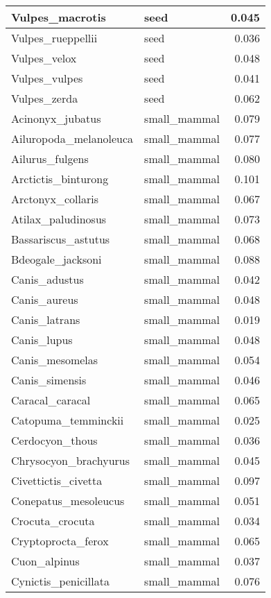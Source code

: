 \begin{table}
\begin{tabular}[t]{l|l|r}
\hline
Vulpes\_macrotis & seed & 0.045\\
\hline
Vulpes\_rueppellii & seed & 0.036\\
\hline
Vulpes\_velox & seed & 0.048\\
\hline
Vulpes\_vulpes & seed & 0.041\\
\hline
Vulpes\_zerda & seed & 0.062\\
\hline
Acinonyx\_jubatus & small\_mammal & 0.079\\
\hline
Ailuropoda\_melanoleuca & small\_mammal & 0.077\\
\hline
Ailurus\_fulgens & small\_mammal & 0.080\\
\hline
Arctictis\_binturong & small\_mammal & 0.101\\
\hline
Arctonyx\_collaris & small\_mammal & 0.067\\
\hline
Atilax\_paludinosus & small\_mammal & 0.073\\
\hline
Bassariscus\_astutus & small\_mammal & 0.068\\
\hline
Bdeogale\_jacksoni & small\_mammal & 0.088\\
\hline
Canis\_adustus & small\_mammal & 0.042\\
\hline
Canis\_aureus & small\_mammal & 0.048\\
\hline
Canis\_latrans & small\_mammal & 0.019\\
\hline
Canis\_lupus & small\_mammal & 0.048\\
\hline
Canis\_mesomelas & small\_mammal & 0.054\\
\hline
Canis\_simensis & small\_mammal & 0.046\\
\hline
Caracal\_caracal & small\_mammal & 0.065\\
\hline
Catopuma\_temminckii & small\_mammal & 0.025\\
\hline
Cerdocyon\_thous & small\_mammal & 0.036\\
\hline
Chrysocyon\_brachyurus & small\_mammal & 0.045\\
\hline
Civettictis\_civetta & small\_mammal & 0.097\\
\hline
Conepatus\_mesoleucus & small\_mammal & 0.051\\
\hline
Crocuta\_crocuta & small\_mammal & 0.034\\
\hline
Cryptoprocta\_ferox & small\_mammal & 0.065\\
\hline
Cuon\_alpinus & small\_mammal & 0.037\\
\hline
Cynictis\_penicillata & small\_mammal & 0.076\\
\hline

\end{tabular}
\end{table}
